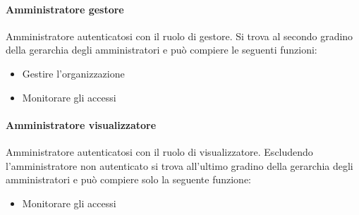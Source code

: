 \paragraph{Amministratore gestore}
Amministratore autenticatosi con il ruolo di gestore. 
Si trova al secondo gradino della gerarchia degli amministratori e può compiere le seguenti funzioni:
\begin{itemize}
\item Gestire l'organizzazione
\item Monitorare gli accessi
\end{itemize}
\paragraph{Amministratore visualizzatore}
Amministratore autenticatosi con il ruolo di visualizzatore.
Escludendo l'amministratore non autenticato si trova all'ultimo gradino della gerarchia degli amministratori e può compiere solo la seguente funzione:
\begin{itemize}
\item Monitorare gli accessi
\end{itemize}




